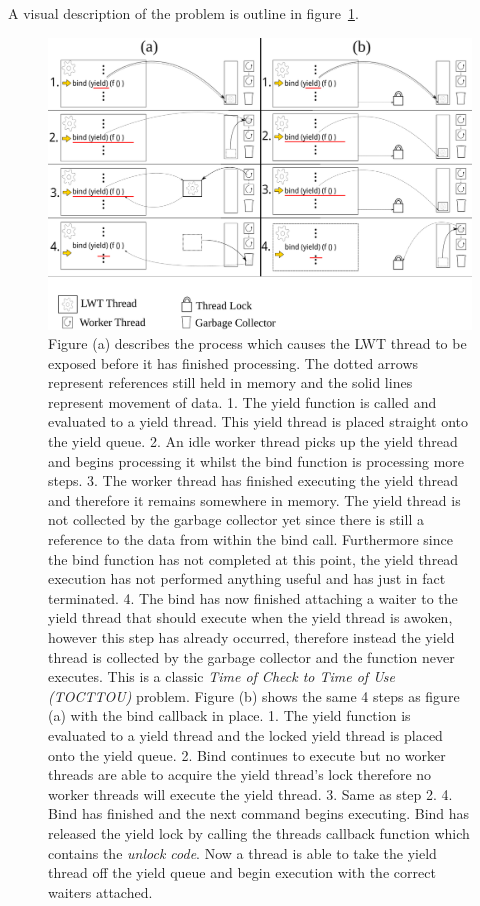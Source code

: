 \documentclass[12pt,twoside,notitlepage]{report}
\begin{document}
A visual description of the problem is outline in figure~\ref{fig:bind_callback}.
\begin{figure}[h!]
\includegraphics[width=\linewidth]{bind_callback}
\caption[Bind Callback diagram]{Figure (a) describes the process which causes the LWT thread to be exposed before it has finished processing. The dotted arrows represent references still held in memory and the solid lines represent movement of data. 1. The
yield function is called and evaluated to a yield thread. This yield thread is placed straight onto the yield queue. 2. An idle worker thread picks up the yield thread and begins processing it whilst the bind function is processing
more steps. 3. The worker thread has finished executing the yield thread and therefore it remains somewhere in memory. The yield thread is not collected by the garbage collector yet since there is still a reference to the data from
within the bind call. Furthermore since the bind function has not completed at this point, the yield thread execution has not performed anything useful and has just in fact terminated. 4. The bind has now finished attaching a waiter to
the yield thread that should execute when the yield thread is awoken, however this step has already occurred, therefore instead the yield thread is collected by the garbage collector and the function never executes. This is a classic
{\em Time of Check to Time of Use (TOCTTOU)} problem. Figure (b) shows the same 4 steps as figure (a) with the bind callback in place. 1. The yield function is evaluated to a yield thread and the locked yield thread is placed onto the
yield queue. 2. Bind continues to execute but no worker threads are able to acquire the yield thread's lock therefore no worker threads will execute the yield thread. 3. Same as step 2. 4. Bind has finished and the next command begins
executing. Bind has released the yield lock by calling the threads callback function which contains the {\em unlock code}. Now a thread is able to take the yield thread off the yield queue and begin execution with the correct waiters
attached.}

\label{fig:bind_callback}
\end{figure}
\end{document}

